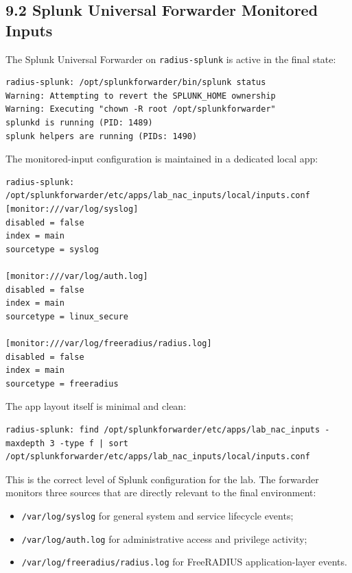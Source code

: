 \documentclass[11pt]{article}
\begin{document}
\subsection{9.2 Splunk Universal Forwarder Monitored Inputs}
\label{sec:splunk-universal-forwarder-monitored-inputs}

The Splunk Universal Forwarder on \texttt{radius-splunk} is active in the final state:

\begin{verbatim}
radius-splunk: /opt/splunkforwarder/bin/splunk status
Warning: Attempting to revert the SPLUNK_HOME ownership
Warning: Executing "chown -R root /opt/splunkforwarder"
splunkd is running (PID: 1489)
splunk helpers are running (PIDs: 1490)
\end{verbatim}

The monitored-input configuration is maintained in a dedicated local app:

\begin{verbatim}
radius-splunk: /opt/splunkforwarder/etc/apps/lab_nac_inputs/local/inputs.conf
[monitor:///var/log/syslog]
disabled = false
index = main
sourcetype = syslog

[monitor:///var/log/auth.log]
disabled = false
index = main
sourcetype = linux_secure

[monitor:///var/log/freeradius/radius.log]
disabled = false
index = main
sourcetype = freeradius
\end{verbatim}

The app layout itself is minimal and clean:

\begin{verbatim}
radius-splunk: find /opt/splunkforwarder/etc/apps/lab_nac_inputs -maxdepth 3 -type f | sort
/opt/splunkforwarder/etc/apps/lab_nac_inputs/local/inputs.conf
\end{verbatim}

This is the correct level of Splunk configuration for the lab. The forwarder monitors three sources that are directly relevant to the final environment:

\begin{itemize}
    \item \texttt{/var/log/syslog} for general system and service lifecycle events;
    \item \texttt{/var/log/auth.log} for administrative access and privilege activity;
    \item \texttt{/var/log/freeradius/radius.log} for FreeRADIUS application-layer events.
\end{itemize}
\end{document}

